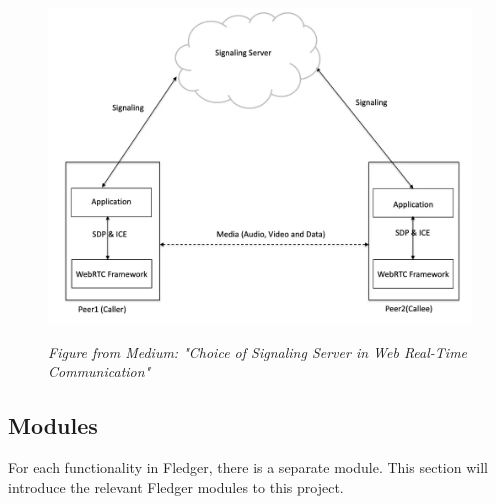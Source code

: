 \documentclass[a4paper,11pt,oneside]{report}
\begin{document}
\begin{figure}[H]
    \centering
    \includegraphics[width=0.8\linewidth]{plots/webrtc.png}
    \caption{}
    \label{fig:webrtc}
    \small\textit{Figure from Medium: "Choice of Signaling Server in Web Real-Time Communication"}
\end{figure}

\subsection{Modules}
\label{sec:fledger_modules}

For each functionality in Fledger, there is a separate module. This section will introduce the relevant Fledger modules to this project.
\end{document}
